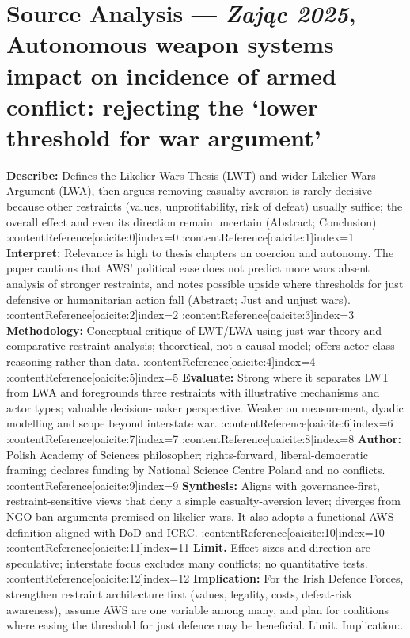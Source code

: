 \section*{Source Analysis — \textit{Zając 2025}, Autonomous weapon systems impact on incidence of armed conflict: rejecting the ‘lower threshold for war argument’}
\textbf{Describe:} Defines the Likelier Wars Thesis (LWT) and wider Likelier Wars Argument (LWA), then argues removing casualty aversion is rarely decisive because other restraints (values, unprofitability, risk of defeat) usually suffice; the overall effect and even its direction remain uncertain (Abstract; Conclusion). :contentReference[oaicite:0]{index=0} :contentReference[oaicite:1]{index=1}
\textbf{Interpret:} Relevance is high to thesis chapters on coercion and autonomy. The paper cautions that AWS’ political ease does not predict more wars absent analysis of stronger restraints, and notes possible upside where thresholds for just defensive or humanitarian action fall (Abstract; Just and unjust wars). :contentReference[oaicite:2]{index=2} :contentReference[oaicite:3]{index=3}
\textbf{Methodology:} Conceptual critique of LWT/LWA using just war theory and comparative restraint analysis; theoretical, not a causal model; offers actor-class reasoning rather than data. :contentReference[oaicite:4]{index=4} :contentReference[oaicite:5]{index=5}
\textbf{Evaluate:} Strong where it separates LWT from LWA and foregrounds three restraints with illustrative mechanisms and actor types; valuable decision-maker perspective. Weaker on measurement, dyadic modelling and scope beyond interstate war. :contentReference[oaicite:6]{index=6} :contentReference[oaicite:7]{index=7} :contentReference[oaicite:8]{index=8}
\textbf{Author:} Polish Academy of Sciences philosopher; rights-forward, liberal-democratic framing; declares funding by National Science Centre Poland and no conflicts. :contentReference[oaicite:9]{index=9}
\textbf{Synthesis:} Aligns with governance-first, restraint-sensitive views that deny a simple casualty-aversion lever; diverges from NGO ban arguments premised on likelier wars. It also adopts a functional AWS definition aligned with DoD and ICRC. :contentReference[oaicite:10]{index=10} :contentReference[oaicite:11]{index=11}
\textbf{Limit.} Effect sizes and direction are speculative; interstate focus excludes many conflicts; no quantitative tests. :contentReference[oaicite:12]{index=12}
\textbf{Implication:} For the Irish Defence Forces, strengthen restraint architecture first (values, legality, costs, defeat-risk awareness), assume AWS are one variable among many, and plan for coalitions where easing the threshold for just defence may be beneficial. Limit. Implication:.

